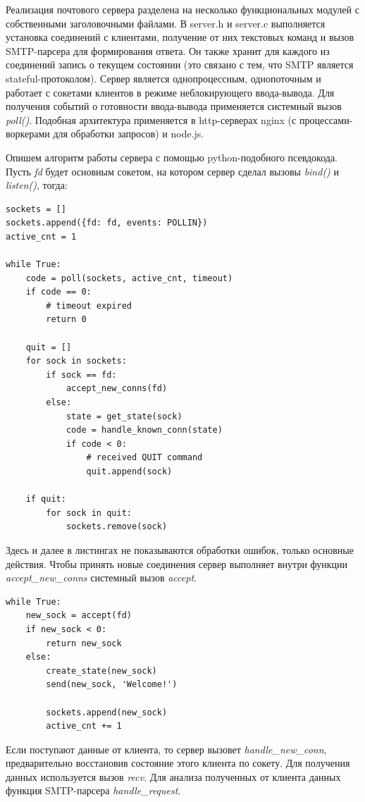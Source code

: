 \documentclass[a4paper,12pt]{report}
\begin{document}
Реализация почтового сервера разделена на несколько функциональных модулей с собственными заголовочными файлами. В server.h и server.c выполняется установка соединений с клиентами, получение от них текстовых команд и вызов SMTP-парсера для формирования ответа. Он также хранит для каждого из соединений запись о текущем состоянии (это связано с тем, что SMTP является stateful-протоколом). Сервер является однопроцессным, однопоточным и работает с сокетами клиентов в режиме неблокирующего ввода-вывода. Для получения событий о готовности ввода-вывода применяется системный вызов \textit{poll()}. Подобная архитектура применяется в http-серверах nginx (с процессами-воркерами для обработки запросов) и node.js.

Опишем алгоритм работы сервера с помощью python-подобного псевдокода. Пусть \textit{fd} будет основным сокетом, на котором сервер сделал вызовы \textit{bind()} и \textit{listen()}, тогда:

\begin{verbatim}
sockets = []
sockets.append({fd: fd, events: POLLIN})
active_cnt = 1

while True:
    code = poll(sockets, active_cnt, timeout)
    if code == 0:
        # timeout expired
        return 0

    quit = []
    for sock in sockets:
        if sock == fd:
            accept_new_conns(fd)
        else:
            state = get_state(sock)
            code = handle_known_conn(state) 
            if code < 0:
                # received QUIT command
                quit.append(sock)

    if quit:
        for sock in quit:
            sockets.remove(sock)
\end{verbatim}

Здесь и далее в листингах не показываются обработки ошибок, только основные действия. Чтобы принять новые соединения сервер выполняет внутри функции \textit{accept_new_conns} системный вызов \textit{accept}.

\begin{verbatim}
while True:
    new_sock = accept(fd)
    if new_sock < 0:
        return new_sock
    else:
        create_state(new_sock)
        send(new_sock, 'Welcome!')

        sockets.append(new_sock)
        active_cnt += 1
\end{verbatim}

Если поступают данные от клиента, то сервер вызовет \textit{handle_new_conn}, предварительно восстановив состояние этого клиента по сокету. Для получения данных используется вызов \textit{recv}. Для анализа полученных от клиента данных функция SMTP-парсера \textit{handle_request}.
\end{document}
